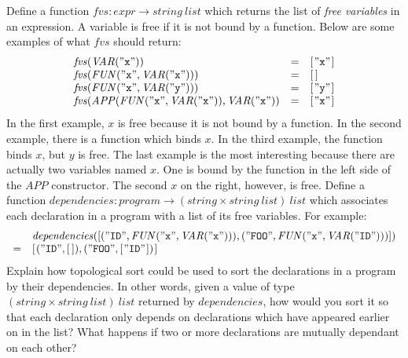 \documentclass[10pt,a4paper]{exam}
\begin{document}
\begin{questions}
Define a function $\mathit{fvs} : \mathit{expr} \to \mathit{string}~\mathit{list}$ which returns the list of \emph{free variables} in an expression. A variable is free if it is not bound by a function. Below are some examples of what $\mathit{fvs}$ should return:
\begin{displaymath}
\begin{array}{lcl}
\mathit{fvs}(\mathit{VAR}(\mathtt{"x"})) & = & \hslist{\mathtt{"x"}} \\
\mathit{fvs}(\mathit{FUN}(\mathtt{"x"}, \mathit{VAR}(\mathtt{"x"}))) & = & \hslist{} \\
\mathit{fvs}(\mathit{FUN}(\mathtt{"x"}, \mathit{VAR}(\mathtt{"y"}))) & = & \hslist{\mathtt{"y"}} \\
\mathit{fvs}(\mathit{APP}(\mathit{FUN}(\mathtt{"x"}, \mathit{VAR}(\mathtt{"x"})), \mathit{VAR}(\mathtt{"x"})) & = & \hslist{\mathtt{"x"}} 
\end{array}
\end{displaymath}
In the first example, $x$ is free because it is not bound by a function. In the second example, there is a function which binds $x$. In the third example, the function binds $x$, but $y$ is free. The last example is the most interesting because there are actually two variables named $x$. One is bound by the function in the left side of the $\mathit{APP}$ constructor. The second $x$ on the right, however, is free. \droppoints 
\question[4] Define a function $\mathit{dependencies} : \mathit{program} \to (\mathit{string} \times \mathit{string}~\mathit{list})~\mathit{list}$ which associates each declaration in a program with a list of its free variables. For example:
\begin{displaymath}
\begin{array}{cl}
 & \mathit{dependencies}([(\mathtt{"ID"}, \mathit{FUN}(\mathtt{"x"}, \mathit{VAR}(\mathtt{"x"}))), (\mathtt{"FOO"}, \mathit{FUN}(\mathtt{"x"}, \mathit{VAR}(\mathtt{"ID"})))]) \\
 = & \hslist{(\mathtt{"ID"}, \hslist{}), (\mathtt{"FOO"}, \hslist{\mathtt{"ID"}})}
\end{array}
\end{displaymath}
 \droppoints 
\question[6] Explain how topological sort could be used to sort the declarations in a program by their dependencies. In other words, given a value of type $(\mathit{string} \times \mathit{string}~\mathit{list})~\mathit{list}$ returned by $\mathit{dependencies}$, how would you sort it so that each declaration only depends on declarations which have appeared earlier on in the list? What happens if two or more declarations are mutually dependant on each other? \droppoints 

\end{questions}
\end{document}

